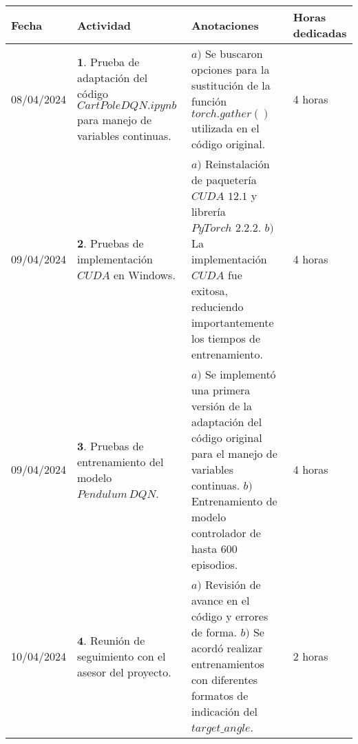 \documentclass[12pt]{article}
\begin{document}
\begin{minipage}[h]{\textwidth}
	\centering
	\begin{tabularx}{\textwidth}{|p{2cm}|X|X|p{2cm}|} 
		\hline
		\rowcolor{encabezado}
		\textbf{Fecha} & 
		\textbf{Actividad} & 
		\textbf{Anotaciones} & 
		\textbf{Horas dedicadas} \\ \hline
	 	08/04/2024 & 
	 	$\mathbf{1}.$ Prueba de adaptación del código $CartPoleDQN.ipynb$ para manejo de variables continuas. & 
	 	$a)$ Se buscaron opciones para la sustitución de la función $torch.gather()$ utilizada en el código original. \newline & 
	 	4 horas \\
		09/04/2024 & 
	 	$\mathbf{2}.$ Pruebas de implementación $CUDA$ en Windows. &
	 	$a)$ Reinstalación de paquetería $CUDA\,\, 12.1$ y librería $PyTorch\,\, 2.2.2$. \newline
	 	$b)$ La implementación $CUDA$ fue exitosa, reduciendo importantemente los tiempos de entrenamiento. \newline & 
	 	4 horas \\
		09/04/2024 & 
	 	$\mathbf{3}.$ Pruebas de entrenamiento del modelo $Pendulum\, DQN$. &
	 	$a)$ Se implementó una primera versión de la adaptación del código original para el manejo de variables continuas. \newline
	 	$b)$ Entrenamiento de modelo controlador de hasta $600$ episodios. \newline & 
	 	4 horas \\
	 	10/04/2024 & 
	 	$\mathbf{4}.$ Reunión de seguimiento con el asesor del proyecto. & 
	 	$a)$ Revisión de avance en el código y errores de forma.  \newline
	 	$b)$ Se acordó realizar entrenamientos con diferentes formatos de indicación del $target\_angle$.  \newline & 
	 	2 horas \\
	 	\hline
	\end{tabularx}
\end{minipage}	 	
	 	
\end{document}

